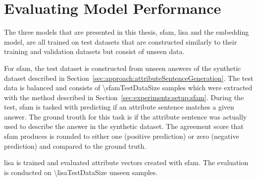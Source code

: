 \section{Evaluating Model Performance}
\label{sec:experiments:models}
The three models that are presented in this thesis, \ac{sfam}, \ac{lisa} and the embedding model, are all trained on test datasets that are constructed similarly to their training and validation datasets but consist of unseen data.

For \ac{sfam}, the test dataset is constructed from unseen answers of the synthetic dataset described in Section~\ref{sec:approach:attributeSentenceGeneration}. The test data is balanced and consists of \num{\sfamTestDataSize} samples which were extracted with the method described in Section~\ref{sec:experiments:setup:sfam}.
During the test, \ac{sfam} is tasked with predicting if an attribute sentence matches a given answer. The ground trouth for this task is if the attribute sentence was actually used to describe the answer in the synthetic dataset. The agreement score that \ac{sfam} produces is rounded to either one (positive prediction) or zero (negative prediction) and compared to the ground truth. %

\ac{lisa} is trained and evaluated attribute vectors created with \ac{sfam}. The evaluation is conducted on \num{\lisaTestDataSize} unseen samples. %


